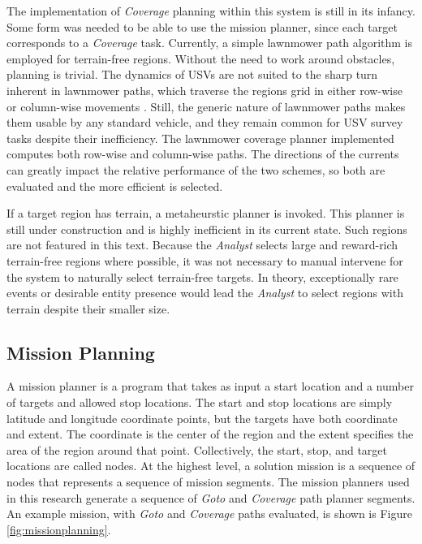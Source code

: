 \documentclass{tamuccthesis}
\begin{document}
The implementation of \textit{Coverage} planning within this system is still in its infancy. Some form was needed to be able to use the mission planner, since each target corresponds to a \textit{Coverage} task. Currently, a simple lawnmower path algorithm is employed for terrain-free regions. Without the need to work around obstacles, planning is trivial. The dynamics of USVs are not suited to the sharp turn inherent in lawnmower paths, which traverse the regions grid in either row-wise or column-wise movements \cite{liu:2016}. Still, the generic nature of lawnmower paths makes them usable by any standard vehicle, and they remain common for USV survey tasks despite their inefficiency. The lawnmower coverage planner implemented computes both row-wise and column-wise paths. The directions of the currents can greatly impact the relative performance of the two schemes, so both are evaluated and the more efficient is selected. 

If a target region has terrain, a metaheurstic planner is invoked. This planner is still under construction and is highly inefficient in its current state. Such regions are not featured in this text. Because the \textit{\textit{Analyst}} selects large and reward-rich terrain-free regions where possible, it was not necessary to manual intervene for the system to naturally select terrain-free targets. In theory, exceptionally rare events or desirable entity presence would lead the \textit{\textit{Analyst}} to select regions with terrain despite their smaller size.


\subsection{Mission Planning}

A mission planner is a program that takes as input a start location and a number of targets and allowed stop locations. The start and stop locations are simply latitude and longitude coordinate points, but the targets have both coordinate and extent. The coordinate is the center of the region and the extent specifies the area of the region around that point. Collectively, the start, stop, and target locations are called nodes. At the highest level, a solution mission is a sequence of nodes that represents a sequence of mission segments. The mission planners used in this research generate a sequence of \textit{Goto} and \textit{Coverage} path planner segments. An example mission, with \textit{Goto} and \textit{Coverage} paths evaluated, is shown is Figure \ref{fig:missionplanning}. 
\end{document}
